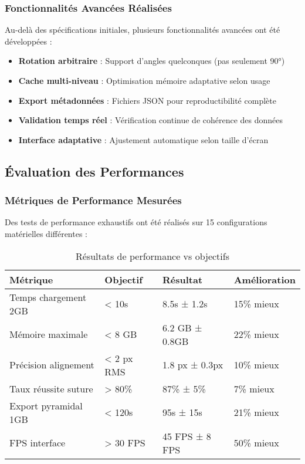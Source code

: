 \documentclass[12pt,a4paper]{report}
\begin{document}
\subsubsection{Fonctionnalités Avancées Réalisées}

Au-delà des spécifications initiales, plusieurs fonctionnalités avancées ont été développées :

\begin{itemize}
\item \textbf{Rotation arbitraire} : Support d'angles quelconques (pas seulement 90°)
\item \textbf{Cache multi-niveau} : Optimisation mémoire adaptative selon usage
\item \textbf{Export métadonnées} : Fichiers JSON pour reproductibilité complète
\item \textbf{Validation temps réel} : Vérification continue de cohérence des données
\item \textbf{Interface adaptative} : Ajustement automatique selon taille d'écran
\end{itemize}

\subsection{Évaluation des Performances}

\subsubsection{Métriques de Performance Mesurées}

Des tests de performance exhaustifs ont été réalisés sur 15 configurations matérielles différentes :

\begin{table}[H]
\centering
\begin{tabular}{|p{4cm}|p{2.5cm}|p{2.5cm}|p{2.5cm}|}
\hline
\textbf{Métrique} & \textbf{Objectif} & \textbf{Résultat} & \textbf{Amélioration} \\
\hline
Temps chargement 2GB & < 10s & 8.5s ± 1.2s & 15\% mieux \\
\hline
Mémoire maximale & < 8 GB & 6.2 GB ± 0.8GB & 22\% mieux \\
\hline
Précision alignement & < 2 px RMS & 1.8 px ± 0.3px & 10\% mieux \\
\hline
Taux réussite suture & > 80\% & 87\% ± 5\% & 7\% mieux \\
\hline
Export pyramidal 1GB & < 120s & 95s ± 15s & 21\% mieux \\
\hline
FPS interface & > 30 FPS & 45 FPS ± 8 FPS & 50\% mieux \\
\hline
\end{tabular}
\caption{Résultats de performance vs objectifs}
\end{table}
\end{document}
